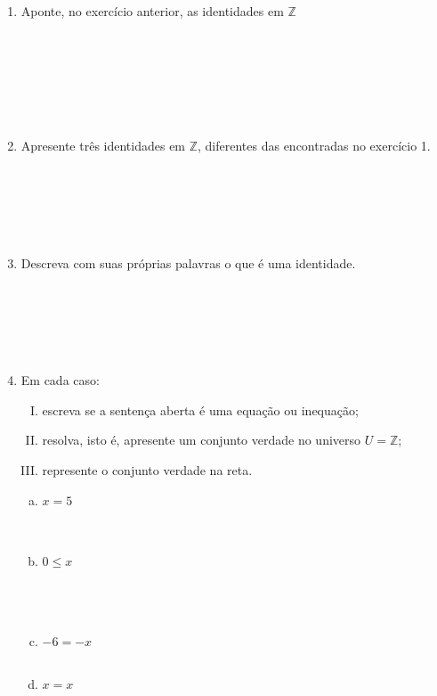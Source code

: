 \documentclass[a4paper,14pt]{article}
\begin{document}
\begin{multicols}{2}
\begin{enumerate}
    		\item Aponte, no exercício anterior, as identidades em $\mathbb{Z}$ \\\\\\\\\\\\\\
    		\item Apresente três identidades em $\mathbb{Z}$, diferentes das encontradas no exercício 1. \\\\\\\\\\\\
    		\item Descreva com suas próprias palavras o que é uma identidade. \\\\\\\\\\\\
    		\item Em cada caso: \begin{enumerate}[I.]
    			\item escreva se a sentença aberta é uma equação ou inequação;
    			\item resolva, isto é, apresente um conjunto verdade no universo $U = \mathbb{Z}$;
    			\item represente o conjunto verdade na reta.
    		\end{enumerate}
    			\begin{enumerate}[a)]
    				\item $x = 5$ \\\\\\
    				\item $0 \leq x$ \\\\\\\\
    				\item $-6 = -x$ \\\\
    				\item $x = x$ \\\\\\\\\\

\end{enumerate}
\end{enumerate}
\end{multicols}
\end{document}
